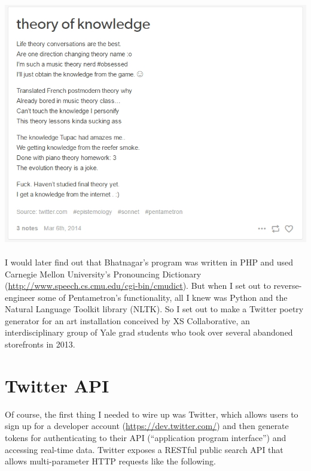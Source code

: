 \documentclass[a0,final]{a0poster}
\begin{document}
\begin{multicols}{3}
\includegraphics{tweet1.jpg}\\
\\
I would later find out that Bhatnagar's program was written in PHP and used Carnegie Mellon University's Pronouncing Dictionary (\url{http://www.speech.cs.cmu.edu/cgi-bin/cmudict}). But when I set out to reverse-engineer some of Pentametron's functionality, all I knew was Python and the Natural Language Toolkit library (NLTK). So I set out to make a Twitter poetry generator for an art installation conceived by XS Collaborative, an interdisciplinary group of Yale grad students who took over several abandoned storefronts in 2013.


\section*{Twitter API}
Of course, the first thing I needed to wire up was Twitter, which allows users to sign up for a developer account (\url{https://dev.twitter.com/}) and then generate tokens for authenticating to their API (``application program interface'') and accessing real-time data. Twitter exposes a RESTful public search API that allows multi-parameter HTTP requests like the following.\\


\end{multicols}
\end{document}
